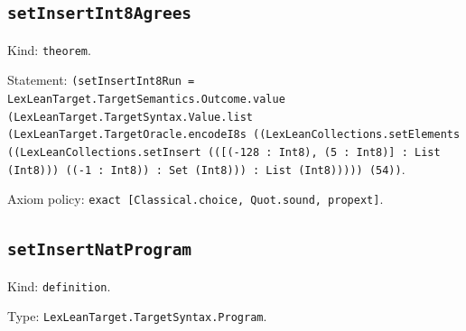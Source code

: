 \documentclass[11pt]{article}
\begin{document}
\subsection*{\texttt{setInsertInt8Agrees}}
\noindent Kind: \texttt{theorem}.\par
\noindent Statement: \texttt{(setInsertInt8Run = LexLeanTarget.TargetSemantics.Outcome.value (LexLeanTarget.TargetSyntax.Value.list (LexLeanTarget.TargetOracle.encodeI8s ((LexLeanCollections.setElements ((LexLeanCollections.setInsert (([(-128 : Int8), (5 : Int8)] : List (Int8))) ((-1 : Int8)) : Set (Int8))) : List (Int8))))) (54))}.\par
\noindent Axiom policy: \texttt{exact [Classical.choice, Quot.sound, propext]}.\par
\subsection*{\texttt{setInsertNatProgram}}
\noindent Kind: \texttt{definition}.\par
\noindent Type: \texttt{LexLeanTarget.TargetSyntax.Program}.\par
\end{document}
